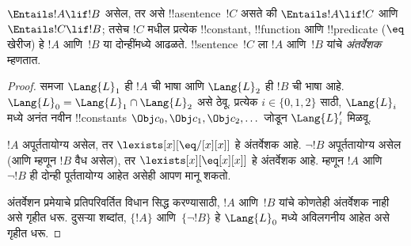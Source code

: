 \documentclass[../../../include/open-logic-section]{subfiles}
\begin{document}


\begin{thm}[क्रेगचे अंतर्वेशन प्रमेय]
$\Entails !A \lif !B$ असेल, तर असे !!a{sentence}~$!C$ असते की
$\Entails !A \lif !C$ आणि $\Entails !C \lif !B$; तसेच $!C$ मधील
प्रत्येक !!{constant}, !!{function} आणि !!{predicate} ($\eq$ खेरीज) हे
$!A$ आणि~$!B$ या दोन्हींमध्ये आढळते. !!{sentence}~$!C$ ला $!A$ आणि~$!B$
यांचे \emph{अंतर्वेशक} म्हणतात.
\end{thm}

\begin{proof}
समजा $\Lang{L}_1$ ही $!A$ ची भाषा आणि $\Lang{L}_2$ ही $!B$ ची भाषा
आहे. $\Lang{L}_0 = \Lang{L}_1 \cap \Lang{L}_2$ असे ठेवू. प्रत्येक
$i \in \{0, 1, 2 \}$ साठी, $\Lang{L}_i$ मध्ये अनंत नवीन !!{constant}s
$\Obj c_0, \Obj c_1, \Obj c_2, \dots$ जोडून $\Lang{L}'_i$ मिळवू.

$!A$ अपूर्ततायोग्य असेल, तर $\lexists[x][\eq/[x][x]]$ हे अंतर्वेशक आहे.
$\lnot !B$ अपूर्ततायोग्य असेल (आणि म्हणून $!B$ वैध असेल), तर
$\lexists[x][\eq[x][x]]$ हे अंतर्वेशक आहे. म्हणून $!A$ आणि~$\lnot !B$
ही दोन्ही पूर्ततायोग्य आहेत असेही आपण मानू शकतो.

अंतर्वेशन प्रमेयाचे प्रतिपरिवर्तित विधान सिद्ध करण्यासाठी, $!A$ आणि~$!B$
यांचे कोणतेही अंतर्वेशक नाही असे गृहीत धरू. दुसऱ्या शब्दांत, $\{!A\}$
आणि~$\{\lnot !B\}$ हे $\Lang{L}_0$ मध्ये अविलगनीय आहेत असे गृहीत धरू.


\end{proof}
\end{document}
